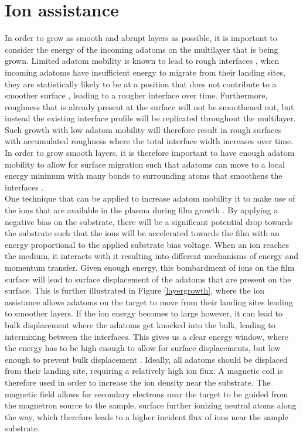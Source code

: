 \section{Ion assistance}\label{ion_assistance}
In order to grow as smooth and abrupt layers as possible, it is important to consider the energy of the incoming adatoms on the multilayer that is being grown. Limited adatom mobility is known to lead to rough interfaces \cite{rough_morphology}, when incoming adatoms have insufficient energy to migrate from their landing sites, they are statistically likely to be at a position that does not contribute to a smoother surface \cite{ERIKSSON200684}, leading to a rougher interface over time. Furthermore, roughness that is already present at the surface will not be smoothened out, but instead the existing interface profile will be replicated throughout the multilayer. Such growth with low adatom mobility will therefore result in rough surfaces with accumulated roughness \cite{thesis_fredrik} where  the total interface width increases over time. In order to grow smooth layers, it is therefore important to have enough adatom mobility to allow for surface migration such that adatoms can move to a local energy minimum with many bonds to surrounding atoms that smoothens the interfaces \cite{ERIKSSON200684}. \\
One technique that can be applied to increase adatom mobility it to make use of the ions that are available in the plasma during film growth \cite{thesis_kenneth}. By applying a negative bias on the substrate, there will be a significant potential drop towards the substrate such that the ions will be accelerated towards the film with an energy proportional to the applied substrate bias voltage. When an ion reaches the medium, it interacts with it resulting into different mechanisms of energy and momentum transfer. Given enough energy, this bombardment of ions on the film surface will lead to surface displacement of the adatoms that are present on the surface. This is further illustrated in Figure \ref{layergrowth}, where the ion assistance allows adatoms on the target to move from their landing sites leading to smoother layers. If the ion energy becomes to large however, it can lead to bulk displacement where the adatoms get knocked into the bulk, leading to intermixing between the interfaces. This gives us a clear energy window, where the energy has to be high enough to allow for surface displacements, but low enough to prevent bulk displacement \cite{ERIKSSON200684}. Ideally, all adatoms should be displaced from their landing site, requiring a relatively high ion flux. A magnetic coil is therefore used in order to increase the ion density near the substrate. The magnetic field allows for secondary electrons near the target to be guided from the magnetron source to the sample, surface further ionizing neutral atoms along the way, which therefore leads to a higher incident flux of ions near the sample substrate. 
